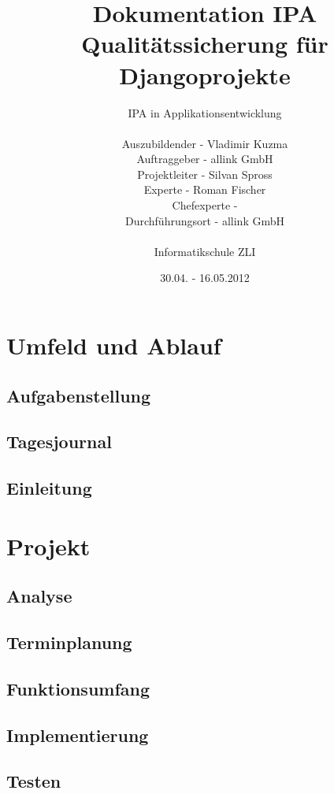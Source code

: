 \documentclass[
11pt, %
a4paper, %
BCOR10mm, %
DIV14, %
footsepline = false, %
headsepline, %
oneside, %
openright,
halfparskip, %
abstracton, %
listof=totocnumbered, %
bibliography=totocnumbered %
]{scrreprt}
\title{Dokumentation IPA Qualitätssicherung für Djangoprojekte}
\author{IPA in Applikationsentwicklung\\
    \\
    Auszubildender - Vladimir Kuzma\\
	Auftraggeber - allink GmbH\\
    Projektleiter - Silvan Spross\\
    Experte - Roman Fischer\\
    Chefexperte -  \\
    Durchführungsort - allink GmbH\\
	\\
	Informatikschule ZLI }
\date{30.04. - 16.05.2012}
\begin{document}
    \ifpdf
    \else
    \fi

  
    \maketitle

  
    \tableofcontents
    
    \part{Umfeld und Ablauf}
         \chapter{Aufgabenstellung}
             
         \chapter{Tagesjournal}
            
            
            
            
            
        \chapter{Einleitung}
            
    \part{Projekt}
         \chapter{Analyse}
            
        \chapter{Terminplanung}
            
        \chapter{Funktionsumfang}
            
        \chapter{Implementierung}
            
        \chapter{Testen}
            
    
    
    
\end{document}
